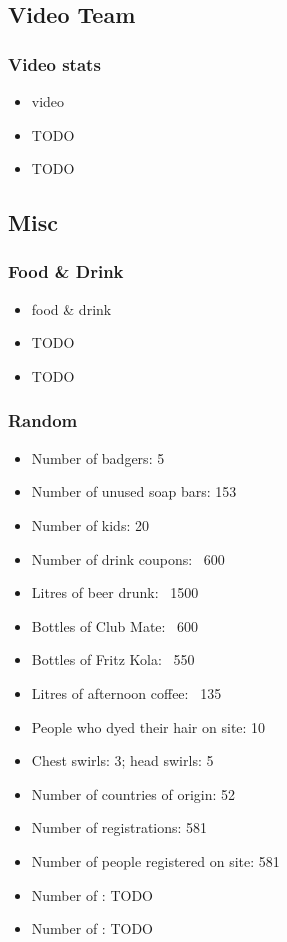 \documentclass[t]{beamer}
\begin{document}
\subsection{Video Team}

\begin{frame}
	\frametitle{Video stats}
	\begin{itemize}
		\item video
		\item TODO
		\item TODO
	\end{itemize}
\end{frame}

\subsection{Misc}

\begin{frame}
	\frametitle{Food \& Drink}
	\begin{itemize}
		\item food \& drink
		\item TODO
		\item TODO
	\end{itemize}
\end{frame}

\begin{frame}
	\frametitle{Random}
	\begin{itemize}
		\item Number of badgers: 5
		\item Number of unused soap bars: 153
		\item Number of kids: 20
		\item Number of drink coupons: ~600
		\item Litres of beer drunk: ~1500
		\item Bottles of Club Mate: ~600
		\item Bottles of Fritz Kola: ~550
		\item Litres of afternoon coffee: ~135
		\item People who dyed their hair on site: 10
		\item Chest swirls: 3; head swirls: 5
		\item Number of countries of origin: 52
		\item Number of registrations: 581
		\item Number of people registered on site: 581
		\item Number of : TODO
		\item Number of : TODO
	\end{itemize}
\end{frame}
\end{document}
